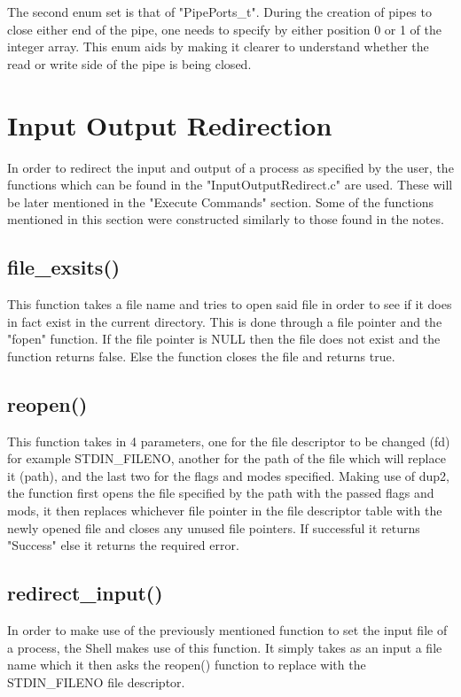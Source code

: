 \documentclass[12pt, a4paper]{report}
\begin{document}
The second enum set is that of "PipePorts\_t". During the creation of pipes to close either end of the pipe, one needs to specify by either position 0 or 1 of the integer array. This enum aids by making it clearer to understand whether the read or write side of the pipe is being closed.

\chapter{Input Output Redirection}
In order to redirect the input and output of a process as specified by the user, the functions which can be found in the "InputOutputRedirect.c" are used. These will be later mentioned in the "Execute Commands" section. Some of the functions mentioned in this section were constructed similarly to those found in the notes.

\section{file\_exsits()}
This function takes a file name and tries to open said file in order to see if it does in fact exist in the current directory. This is done through a file pointer and the "fopen" function. If the file pointer is NULL then the file does not exist and the function returns false. Else the function closes the file and returns true.

\section{reopen()}
This function takes in 4 parameters, one for the file descriptor to be changed (fd) for example STDIN\_FILENO, another for the path of the file which will replace it (path), and the last two for the flags and modes specified. Making use of dup2, the function first opens the file specified by the path with the passed flags and mods, it then replaces whichever file pointer in the file descriptor table with the newly opened file and closes any unused file pointers. If successful it returns "Success" else it returns the required error.

\section{redirect\_input()}
In order to make use of the previously mentioned function to set the input file of a process, the Shell makes use of this function. It simply takes as an input a file name which it then asks the reopen() function to replace with the STDIN\_FILENO file descriptor.
\end{document}
